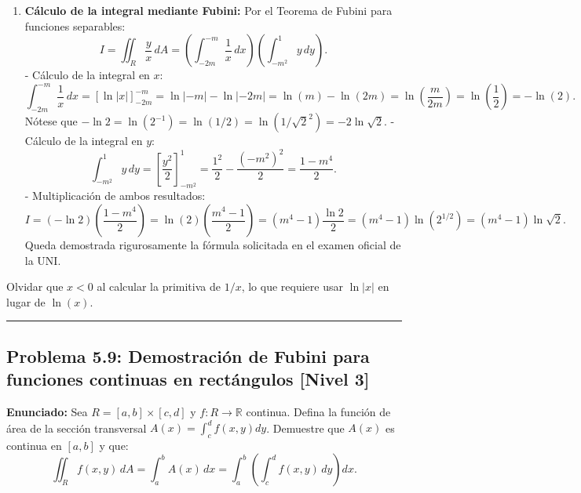 \documentclass[11pt,a4paper]{article}
\begin{document}
\begin{enumerate}[label=\textbf{\arabic*.}]
\item \textbf{Cálculo de la integral mediante Fubini:}
Por el Teorema de Fubini para funciones separables:
\begin{equation*}
I = \iint_R \frac{y}{x} \, dA = \left( \int_{-2m}^{-m} \frac{1}{x} \, dx \right) \left( \int_{-m^2}^1 y \, dy \right).
\end{equation*}
- Cálculo de la integral en $x$:
\begin{equation*}
\int_{-2m}^{-m} \frac{1}{x} \, dx = [\ln|x|]_{-2m}^{-m} = \ln|-m| - \ln|-2m| = \ln(m) - \ln(2m) = \ln\left(\frac{m}{2m}\right) = \ln\left(\frac{1}{2}\right) = -\ln(2).
\end{equation*}
Nótese que $-\ln 2 = \ln(2^{-1}) = \ln(1/2) = \ln(1/\sqrt{2}^2) = -2\ln\sqrt{2}$.
- Cálculo de la integral en $y$:
\begin{equation*}
\int_{-m^2}^1 y \, dy = \left[ \frac{y^2}{2} \right]_{-m^2}^1 = \frac{1^2}{2} - \frac{(-m^2)^2}{2} = \frac{1 - m^4}{2}.
\end{equation*}
- Multiplicación de ambos resultados:
\begin{equation*}
I = (-\ln 2) \left(\frac{1 - m^4}{2}\right) = \ln(2) \left(\frac{m^4 - 1}{2}\right) = (m^4 - 1) \frac{\ln 2}{2} = (m^4 - 1) \ln(2^{1/2}) = (m^4 - 1) \ln\sqrt{2}.
\end{equation*}
Queda demostrada rigurosamente la fórmula solicitada en el examen oficial de la UNI.
\end{enumerate}

\begin{trapbox}
Olvidar que $x < 0$ al calcular la primitiva de $1/x$, lo que requiere usar $\ln|x|$ en lugar de $\ln(x)$.
\end{trapbox}

\vspace{0.5cm}
\hrule
\vspace{0.5cm}

\subsection*{Problema 5.9: Demostración de Fubini para funciones continuas en rectángulos \hfill \color{primaryblue}\small[Nivel 3]}

\begin{tcolorbox}[colback=white,colframe=gray!40,arc=1mm,boxrule=0.5pt,left=3mm,right=3mm,top=2mm,bottom=2mm]
\textbf{Enunciado:} Sea $R = [a,b] \times [c,d]$ y $f: R \to \mathbb{R}$ continua. Defina la función de área de la sección transversal $A(x) = \int_c^d f(x,y) dy$. Demuestre que $A(x)$ es continua en $[a,b]$ y que:
\begin{equation*}
\iint_R f(x,y) \, dA = \int_a^b A(x) \, dx = \int_a^b \left( \int_c^d f(x,y) \, dy \right) dx.
\end{equation*}
\end{tcolorbox}
\end{document}
